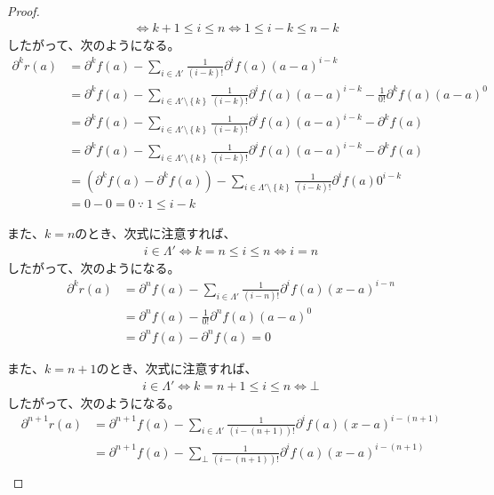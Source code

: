 \documentclass[dvipdfmx]{jsarticle}
\begin{document}
\begin{proof}
\begin{align*}
&\Leftrightarrow k + 1 \leq i \leq n \Leftrightarrow 1 \leq i - k \leq n - k
\end{align*}
したがって、次のようになる。
\begin{align*}
\partial^{k}r(a) &= \partial^{k}f(a) - \sum_{i \in \varLambda' } {\frac{1}{(i - k)!}\partial^{i}f(a)(a - a)^{i - k}}\\
&= \partial^{k}f(a) - \sum_{i \in \varLambda' \setminus \left\{ k \right\}} {\frac{1}{(i - k)!}\partial^{i}f(a)(a - a)^{i - k}} - \frac{1}{0!}\partial^{k}f(a)(a - a)^{0}\\
&= \partial^{k}f(a) - \sum_{i \in \varLambda' \setminus \left\{ k \right\}} {\frac{1}{(i - k)!}\partial^{i}f(a)(a - a)^{i - k}} - \partial^{k}f(a)\\
&= \partial^{k}f(a) - \sum_{i \in \varLambda' \setminus \left\{ k \right\}} {\frac{1}{(i - k)!}\partial^{i}f(a)(a - a)^{i - k}} - \partial^{k}f(a)\\
&= \left( \partial^{k}f(a) - \partial^{k}f(a) \right) - \sum_{i \in \varLambda' \setminus \left\{ k \right\}} {\frac{1}{(i - k)!}\partial^{i}f(a)0^{i - k}}\\
&= 0 - 0 = 0\ \because\ 1 \leq i - k
\end{align*}\par
また、$k = n$のとき、次式に注意すれば、
\begin{align*}
i \in \varLambda' \Leftrightarrow k = n \leq i \leq n \Leftrightarrow i = n
\end{align*}
したがって、次のようになる。
\begin{align*}
\partial^{k}r(a) &= \partial^{n}f(a) - \sum_{i \in \varLambda' } {\frac{1}{(i - n)!}\partial^{i}f(a)(x - a)^{i - n}}\\
&= \partial^{n}f(a) - \frac{1}{0!}\partial^{n}f(a)(a - a)^{0}\\
&= \partial^{n}f(a) - \partial^{n}f(a) = 0
\end{align*}\par
また、$k = n + 1$のとき、次式に注意すれば、
\begin{align*}
i \in \varLambda' \Leftrightarrow k = n + 1 \leq i \leq n \Leftrightarrow \bot
\end{align*}
したがって、次のようになる。
\begin{align*}
\partial^{n + 1}r(a) &= \partial^{n + 1}f(a) - \sum_{i \in \varLambda' } {\frac{1}{\left( i - (n + 1) \right)!}\partial^{i}f(a)(x - a)^{i - (n + 1)}}\\
&= \partial^{n + 1}f(a) - \sum_{\bot } {\frac{1}{\left( i - (n + 1) \right)!}\partial^{i}f(a)(x - a)^{i - (n + 1)}}\\

\end{align*}
\end{proof}
\end{document}
